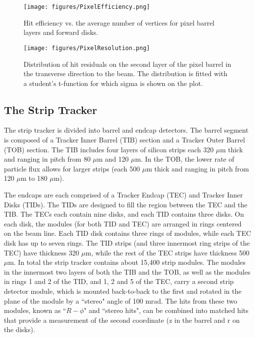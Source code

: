 \begin{figure}\centering
  \texttt{[image: figures/PixelEfficiency.png]}
  \caption{\label{fig:PixelEfficiency} Hit efficiency vs. the average number of vertices for pixel barrel layers and forward disks.}
\end{figure}

\begin{figure}\centering
  \texttt{[image: figures/PixelResolution.png]}
  \caption{\label{fig:PixelResolution} Distribution of hit residuals on the second layer of the pixel barrel in the transverse direction to the beam. The distribution is fitted with a student's t-function for which sigma is shown on the plot.}
\end{figure}

\subsection{The Strip Tracker}

The strip tracker is divided into barrel and endcap detectors. The barrel segment is composed of a Tracker Inner Barrel (TIB) section and a Tracker Outer Barrel (TOB) section. The TIB includes four layers of silicon strips each 320 $\mu$m thick and ranging in pitch from 80 $\mu$m and 120 $\mu$m. In the TOB, the lower rate of particle flux allows for larger strips (each 500 $\mu$m thick and ranging in pitch from 120 $\mu$m to 180 $\mu$m).

The endcaps are each comprised of a Tracker Endcap (TEC) and Tracker Inner Disks (TIDs). The TIDs are designed to fill the region between the TEC and the TIB. The TECs each contain nine disks, and each TID contains three disks. On each disk, the modules (for both TID and TEC) are arranged in rings centered on the beam line. Each TID disk contains three rings of modules, while each TEC disk has up to seven rings. The TID strips (and three innermost ring strips of the TEC) have thickness 320 $\mu$m, while the rest of the TEC strips have thickness 500 $\mu$m. In total the strip tracker contains about 15,400 strip modules. The modules in the innermost two layers of both the TIB and the TOB, as well as the modules in rings 1 and 2 of the TID, and 1, 2 and 5 of the TEC, carry a second strip detector module, which
is mounted back-to-back to the first and rotated in the plane of the module by a ``stereo" angle
of 100 mrad. The hits from these two modules, known as ``$R-\phi$" and ``stereo hits", can be combined
into matched hits that provide a measurement of the second coordinate (z in the barrel and r on
the disks)\cite{TrackReco}\cite{TDR}.



